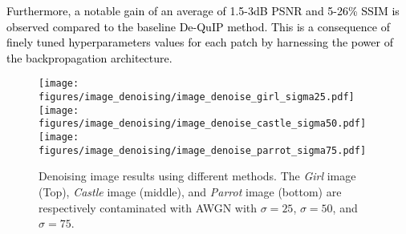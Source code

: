 \documentclass[10pt,journal,compsoc]{IEEEtran}
\newcommand{\sd}{\textcolor{black}}
\newcommand{\dk}{\textcolor{black}}
\begin{document}
\sd{Furthermore, a notable gain of an average of 1.5-3dB PSNR and 5-26\% SSIM is observed compared to the baseline De-QuIP method. This is a consequence of finely tuned hyperparameters values for each patch by harnessing the power of the backpropagation architecture.}












\begin{figure*}[t!]
\begin{centering}

\texttt{[image: figures/image\_denoising/image\_denoise\_girl\_sigma25.pdf]}
\texttt{[image: figures/image\_denoising/image\_denoise\_castle\_sigma50.pdf]}
\texttt{[image: figures/image\_denoising/image\_denoise\_parrot\_sigma75.pdf]}

\end{centering}
\caption{Denoising image results using different methods. The \textit{Girl} image (Top), \textit{Castle} image (middle), and \textit{Parrot} image (bottom) are respectively contaminated with AWGN with $\sigma = 25$, $\sigma = 50$, and $\sigma = 75$.}
\label{fig:image_denoising}
\end{figure*}
\end{document}
